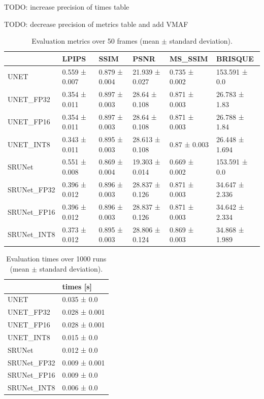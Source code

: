 TODO: increase precision of times table

TODO: decrease precision of metrics table and add VMAF

\begin{table}[t]
\begin{tabular}{llllll}
\toprule
{} &          LPIPS &           SSIM &            PSNR &        MS\_SSIM &         BRISQUE \\
\midrule
UNET        &  0.559 ± 0.007 &  0.879 ± 0.004 &  21.939 ± 0.027 &  0.735 ± 0.002 &   153.591 ± 0.0 \\
UNET\_FP32   &  0.354 ± 0.011 &  0.897 ± 0.003 &   28.64 ± 0.108 &  0.871 ± 0.003 &   26.783 ± 1.83 \\
UNET\_FP16   &  0.354 ± 0.011 &  0.897 ± 0.003 &   28.64 ± 0.108 &  0.871 ± 0.003 &   26.788 ± 1.84 \\
UNET\_INT8   &  0.343 ± 0.011 &  0.895 ± 0.003 &  28.613 ± 0.108 &   0.87 ± 0.003 &  26.448 ± 1.694 \\
SRUNet      &  0.551 ± 0.008 &  0.869 ± 0.004 &  19.303 ± 0.014 &  0.669 ± 0.002 &   153.591 ± 0.0 \\
SRUNet\_FP32 &  0.396 ± 0.012 &  0.896 ± 0.003 &  28.837 ± 0.126 &  0.871 ± 0.003 &  34.647 ± 2.336 \\
SRUNet\_FP16 &  0.396 ± 0.012 &  0.896 ± 0.003 &  28.837 ± 0.126 &  0.871 ± 0.003 &  34.642 ± 2.334 \\
SRUNet\_INT8 &  0.373 ± 0.012 &  0.895 ± 0.003 &  28.806 ± 0.124 &  0.869 ± 0.003 &  34.868 ± 1.989 \\
\bottomrule
\end{tabular}
\caption{Evaluation metrics over 50 frames (mean $\pm$ standard deviation).}
\label{tab:tab1}
\end{table}

\begin{table}[t]
\begin{tabular}{ll}
\toprule
{} &      times [s] \\
\midrule
UNET        &    0.035 ± 0.0 \\
UNET\_FP32   &  0.028 ± 0.001 \\
UNET\_FP16   &  0.028 ± 0.001 \\
UNET\_INT8   &    0.015 ± 0.0 \\
SRUNet      &    0.012 ± 0.0 \\
SRUNet\_FP32 &  0.009 ± 0.001 \\
SRUNet\_FP16 &    0.009 ± 0.0 \\
SRUNet\_INT8 &    0.006 ± 0.0 \\
\bottomrule
\end{tabular}
\caption{Evaluation times over 1000 runs (mean $\pm$ standard deviation).}
\label{tab:tab2}
\end{table}

